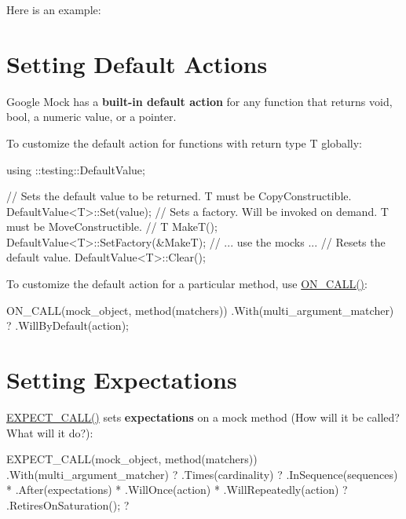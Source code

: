 Here is an example\+: 


\section*{Setting Default Actions}

Google Mock has a {\bfseries built-\/in default action} for any function that returns {\ttfamily void}, {\ttfamily bool}, a numeric value, or a pointer.

To customize the default action for functions with return type {\ttfamily T} globally\+: 
\begin{DoxyCode}
using ::testing::DefaultValue;

// Sets the default value to be returned. T must be CopyConstructible.
DefaultValue<T>::Set(value);
// Sets a factory. Will be invoked on demand. T must be MoveConstructible.
//   T MakeT();
DefaultValue<T>::SetFactory(&MakeT);
// ... use the mocks ...
// Resets the default value.
DefaultValue<T>::Clear();
\end{DoxyCode}


To customize the default action for a particular method, use {\ttfamily \hyperlink{gmock-spec-builders_8h_a5b12ae6cf84f0a544ca811b380c37334}{O\+N\+\_\+\+C\+A\+L\+L()}}\+: 
\begin{DoxyCode}
ON\_CALL(mock\_object, method(matchers))
    .With(multi\_argument\_matcher)  ?
    .WillByDefault(action);
\end{DoxyCode}


\section*{Setting Expectations}

{\ttfamily \hyperlink{gmock-spec-builders_8h_a535a6156de72c1a2e25a127e38ee5232}{E\+X\+P\+E\+C\+T\+\_\+\+C\+A\+L\+L()}} sets {\bfseries expectations} on a mock method (How will it be called? What will it do?)\+: 
\begin{DoxyCode}
EXPECT\_CALL(mock\_object, method(matchers))
    .With(multi\_argument\_matcher)  ?
    .Times(cardinality)            ?
    .InSequence(sequences)         *
    .After(expectations)           *
    .WillOnce(action)              *
    .WillRepeatedly(action)        ?
    .RetiresOnSaturation();        ?
\end{DoxyCode}



